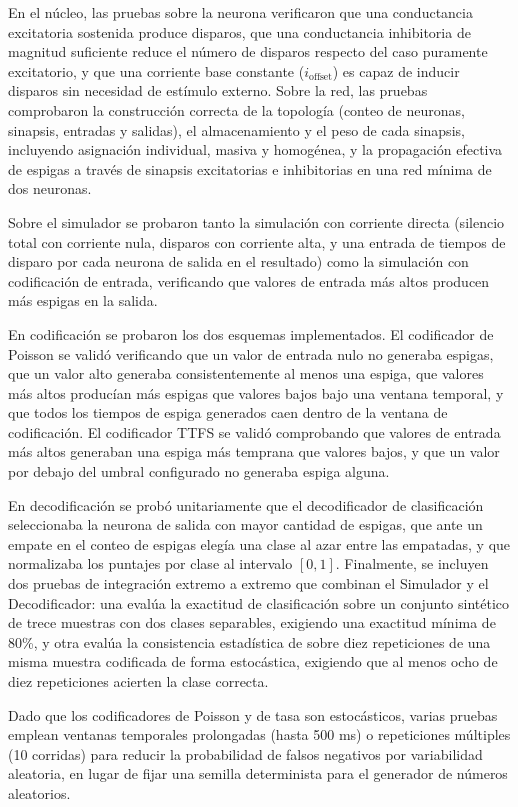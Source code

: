 En el núcleo, las pruebas sobre la neurona verificaron que una conductancia excitatoria sostenida produce disparos, que una conductancia inhibitoria de magnitud suficiente reduce el número de disparos respecto del caso puramente excitatorio, y que una corriente base constante ($i_{\text{offset}}$) es capaz de inducir disparos sin necesidad de estímulo externo. Sobre la red, las pruebas comprobaron la construcción correcta de la topología (conteo de neuronas, sinapsis, entradas y salidas), el almacenamiento y el peso de cada sinapsis, incluyendo asignación individual, masiva y homogénea, y la propagación efectiva de espigas a través de sinapsis excitatorias e inhibitorias en una red mínima de dos neuronas.

Sobre el simulador se probaron tanto la simulación con corriente directa (silencio total con corriente nula, disparos con corriente alta, y una entrada de tiempos de disparo por cada neurona de salida en el resultado) como la simulación con codificación de entrada, verificando que valores de entrada más altos producen más espigas en la salida.

En codificación se probaron los dos esquemas implementados. El codificador de Poisson se validó verificando que un valor de entrada nulo no generaba espigas, que un valor alto generaba consistentemente al menos una espiga, que valores más altos producían más espigas que valores bajos bajo una ventana temporal, y que todos los tiempos de espiga generados caen dentro de la ventana de codificación. El codificador TTFS se validó comprobando que valores de entrada más altos generaban una espiga más temprana que valores bajos, y que un valor por debajo del umbral configurado no generaba espiga alguna.

En decodificación se probó unitariamente que el decodificador de clasificación seleccionaba la neurona de salida con mayor cantidad de espigas, que ante un empate en el conteo de espigas elegía una clase al azar entre las empatadas, y que normalizaba los puntajes por clase al intervalo $[0,1]$. Finalmente, se incluyen dos pruebas de integración extremo a extremo que combinan el Simulador y el Decodificador: una evalúa la exactitud de clasificación sobre un conjunto sintético de trece muestras con dos clases separables, exigiendo una exactitud mínima de 80\%, y otra evalúa la consistencia estadística de sobre diez repeticiones de una misma muestra codificada de forma estocástica, exigiendo que al menos ocho de diez repeticiones acierten la clase correcta.

Dado que los codificadores de Poisson y de tasa son estocásticos, varias pruebas emplean ventanas temporales prolongadas (hasta 500 ms) o repeticiones múltiples (10 corridas) para reducir la probabilidad de falsos negativos por variabilidad aleatoria, en lugar de fijar una semilla determinista para el generador de números aleatorios.


